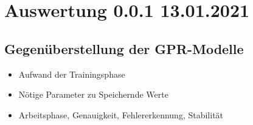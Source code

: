 %

\chapter{Auswertung 0.0.1 13.01.2021}

\section{Gegenüberstellung der GPR-Modelle}
	\begin{itemize}
		\item Aufwand der Trainingsphase
		\item Nötige Parameter zu Speichernde Werte
		\item Arbeitsphase, Genauigkeit, Fehlererkennung, Stabilität
	\end{itemize}